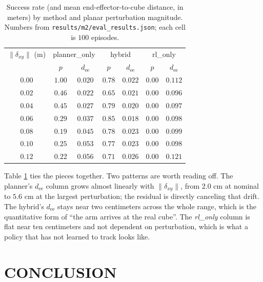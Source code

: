 \documentclass[letterpaper, 11 pt, journal, twoside]{IEEEtran}
\begin{document}
\begin{table}[t]
\centering
\caption{Success rate (and mean end-effector-to-cube distance, in meters) by method and planar perturbation magnitude. Numbers from {\tt results/m2/eval\_results.json}; each cell is $100$ episodes.}
\label{tab:summary}
\small
\begin{tabular}{c|cc|cc|cc}
\hline
$\|\delta_{xy}\|$ (m) & \multicolumn{2}{c|}{planner\_only} & \multicolumn{2}{c|}{hybrid} & \multicolumn{2}{c}{rl\_only}\\
  & $p$ & $d_{\mathrm{ee}}$ & $p$ & $d_{\mathrm{ee}}$ & $p$ & $d_{\mathrm{ee}}$\\
\hline
$0.00$ & $1.00$ & $0.020$ & $0.78$ & $0.022$ & $0.00$ & $0.112$\\
$0.02$ & $0.46$ & $0.022$ & $0.65$ & $0.021$ & $0.00$ & $0.096$\\
$0.04$ & $0.45$ & $0.027$ & $0.79$ & $0.020$ & $0.00$ & $0.097$\\
$0.06$ & $0.29$ & $0.037$ & $0.85$ & $0.018$ & $0.00$ & $0.098$\\
$0.08$ & $0.19$ & $0.045$ & $0.78$ & $0.023$ & $0.00$ & $0.099$\\
$0.10$ & $0.25$ & $0.053$ & $0.77$ & $0.023$ & $0.00$ & $0.098$\\
$0.12$ & $0.22$ & $0.056$ & $0.71$ & $0.026$ & $0.00$ & $0.121$\\
\hline
\end{tabular}
\end{table}

Table \ref{tab:summary} ties the pieces together. Two patterns are worth reading off. The planner's $d_{\mathrm{ee}}$ column grows almost linearly with $\|\delta_{xy}\|$, from $2.0$ cm at nominal to $5.6$ cm at the largest perturbation; the residual is directly canceling that drift. The hybrid's $d_{\mathrm{ee}}$ stays near two centimeters across the whole range, which is the quantitative form of ``the arm arrives at the real cube''. The {\em rl\_only} column is flat near ten centimeters and not dependent on perturbation, which is what a policy that has not learned to track looks like.

\section{CONCLUSION}
\label{sec:conclusion}
\end{document}
